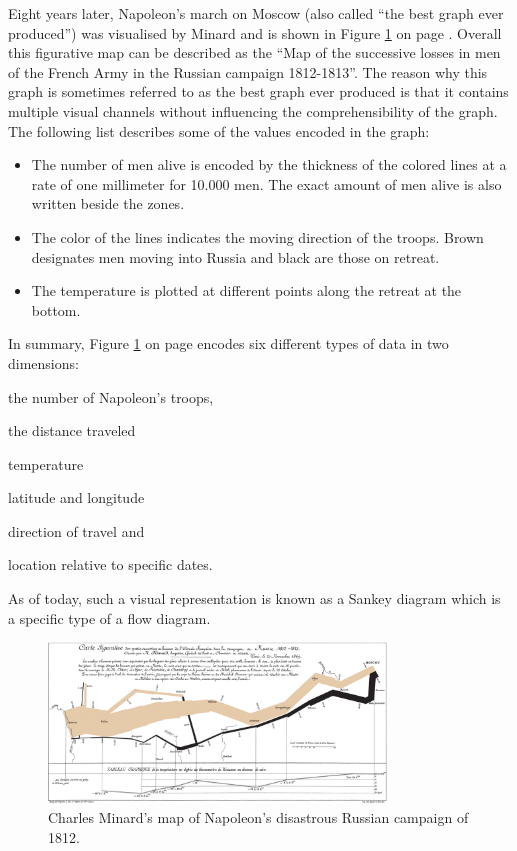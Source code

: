 Eight years later, Napoleon's march on Moscow (also called ``the best graph ever produced'') was visualised by Minard and is shown in Figure \ref{fig:minard2} on page \pageref{fig:minard2}. Overall this figurative map can be described as the ``Map of the successive losses in men of the French Army in the Russian campaign 1812-1813''. The reason why this graph is sometimes referred to as the best graph ever produced is that it contains multiple visual channels without influencing the comprehensibility of the graph. The following list describes some of the values encoded in the graph:
\newpage
\begin{itemize}
\item The number of men alive is encoded by the thickness of the colored lines at a rate of one millimeter for 10.000 men. The exact amount of men alive is also written beside the zones.
\item The color of the lines indicates the moving direction of the troops. Brown designates men moving into Russia and black are those on retreat.
\item The temperature is plotted at different points along the retreat at the bottom.
\end{itemize}
In summary, Figure \ref{fig:minard2} on page \pageref{fig:minard2} encodes six different types of data in two dimensions:
\begin{enumerate*}[label={(\arabic*)}]
\item the number of Napoleon's troops,
\item the distance traveled
\item temperature
\item latitude and longitude
\item direction of travel and
\item location relative to specific dates.
\end{enumerate*}
As of today, such a visual representation is known as a Sankey diagram which is a specific type of a flow diagram.

\begin{figure}[!htb]
\centering
\includegraphics[width=0.8\textwidth,keepaspectratio]{images/history/minard2.png}
\caption[
    Charles Minard's map of Napoleon's disastrous Russian campaign of 1812., Urldate: 07.2016 \newline
\small\texttt{\url{https://upload.wikimedia.org/wikipedia/commons/2/29/Minard.png}}
]{Charles Minard's map of Napoleon's disastrous Russian campaign of 1812.}
\label{fig:minard2}
\end{figure}

